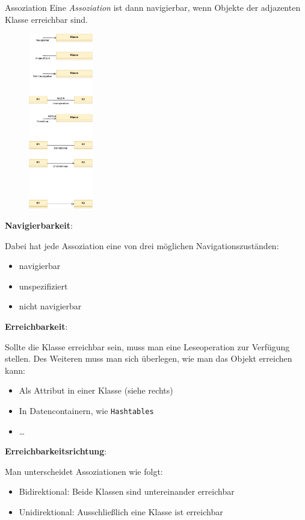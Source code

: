 \begin{diag}{Assoziation}
    Eine \emph{Assoziation} ist dann navigierbar, wenn Objekte der adjazenten Klasse erreichbar sind.

    \begin{figure}
        \centering
        \includegraphics[width=0.25\textwidth]{includes/figures/defi_diagrams_class_assoziation.pdf}
    \end{figure}
    \textbf{Navigierbarkeit}:

    Dabei hat jede Assoziation eine von drei möglichen Navigationszuständen:
    \begin{itemize}
        \item navigierbar
        \item unspezifiziert
        \item nicht navigierbar
    \end{itemize}

    \textbf{Erreichbarkeit}:

    Sollte die Klasse erreichbar sein, muss man eine Leseoperation zur Verfügung stellen.
    Des Weiteren muss man sich überlegen, wie man das Objekt erreichen kann:
    \begin{itemize}
        \item Als Attribut in einer Klasse (siehe rechts)
        \item In Datencontainern, wie \texttt{Hashtables}
        \item \ldots
    \end{itemize}

    \textbf{Erreichbarkeitsrichtung}:

    Man unterscheidet Assoziationen wie folgt:
    \begin{itemize}
        \item Bidirektional: Beide Klassen sind untereinander erreichbar
        \item Unidirektional: Ausschließlich eine Klasse ist erreichbar
    \end{itemize}
\end{diag}

